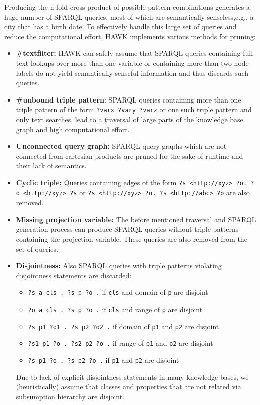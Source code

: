 Producing the n-fold-cross-product of possible pattern combinations generates a huge number of SPARQL queries, most of which are semantically senseless,e.g., a city that has a birth date. 
To effectively handle this large set of queries and reduce the computational effort, HAWK implements various methods for pruning:
\begin{itemize}
\item \textbf{\#textfilter: } HAWK can safely assume that SPARQL queries containing full-text lookups over more than one variable or containing more than two node labels do not yield semantically senseful information and thus discards such queries. 
\item \textbf{\#unbound triple pattern}: SPARQL queries containing more than one triple pattern of the form \texttt{?varx ?vary ?varz} or one such triple pattern and only text searches, lead to a traversal of large parts of the knowledge base graph and high computational effort.
\item \textbf{Unconnected query graph: } SPARQL query graphs which are not connected from cartesian products are pruned for the sake of runtime and their lack of semantics.
\item \textbf{Cyclic triple: } Queries containing edges of the form \texttt{?s <http://xyz>  ?o. ?o <http://xyz> ?s} or \texttt{?s <http://xyz>  ?o. ?s <http://abc> ?o} are also removed. 
\item \textbf{Missing projection variable: } The before mentioned traversal and SPARQL generation process can produce SPARQL queries without triple patterns containing the projection variable. These queries are also removed from the set of queries.
\item \textbf{Disjointness: }
Also SPARQL queries with triple patterns violating disjointness statements are discarded:
\begin{itemize}
\item \texttt{?s a  cls . ?s p ?o .} if \texttt{cls} and domain of \texttt{p} are disjoint
\item \texttt{?o a  cls . ?s p ?o .} if \texttt{cls} and range of \texttt{p} are disjoint
\item \texttt{?s p1  ?o1 . ?s p2 ?o2 .} if domain of \texttt{p1} and \texttt{p2} are disjoint
\item \texttt{?s1 p1  ?o . ?s2 p2 ?o .} if range of \texttt{p1} and \texttt{p2} are disjoint
\item \texttt{?s p1  ?o . ?s p2 ?o .} if \texttt{p1} and \texttt{p2} are disjoint
\end{itemize}
Due to lack of explicit disjointness statements in many knowledge bases, we (heuristically) assume that classes and properties that are not related via subsumption hierarchy are disjoint.
\end{itemize}

